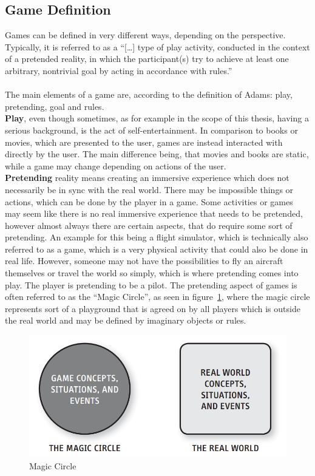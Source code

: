 \subsection{Game Definition}\label{subsec:game-definition}
Games can be defined in very different ways, depending on the perspective.
Typically, it is referred to as a ``[\ldots] type of play activity, conducted in the context of a pretended reality, in which the participant(s)
try to achieve at least one arbitrary, nontrivial goal by acting in accordance with rules.''~\cite{10.5555/2544002}
\\
\\
The main elements of a game are, according to the definition of Adams: play, pretending, goal and rules.
\\
\textbf{Play}, even though sometimes, as for example in the scope of this thesis, having a serious background, is the act of
self-entertainment.
In comparison to books or movies, which are presented to the user, games are instead interacted with directly by the user.
The main difference being, that movies and books are static, while a game may change depending on actions of the user.
\\
\textbf{Pretending} reality means creating an immersive experience which does not necessarily be in sync with the real world.
There may be impossible things or actions, which can be done by the player in a game.
Some activities or games may seem like there is no real immersive experience that needs to be pretended, however almost always there are certain
aspects, that do require some sort of pretending.
An example for this being a flight simulator, which is technically also referred to as a game, which is a very physical activity that could also be done
in real life.
However, someone may not have the possibilities to fly an aircraft themselves or travel the world so simply, which is where pretending comes into play.
The player is pretending to be a pilot. 
The pretending aspect of games is often referred to as the ``Magic Circle'', as seen in figure~\ref{fig:magic-circle}, where the magic circle represents sort of a
playground that is agreed on by all players which is outside the real world and may be defined by imaginary objects or rules.
\begin{figure}
    \centering
    \includegraphics[width=\textwidth]{./Pictures/res/fundamentals/magic-circle}
    \caption{Magic Circle~\cite{10.5555/2544002}}
    \label{fig:magic-circle}
\end{figure}
